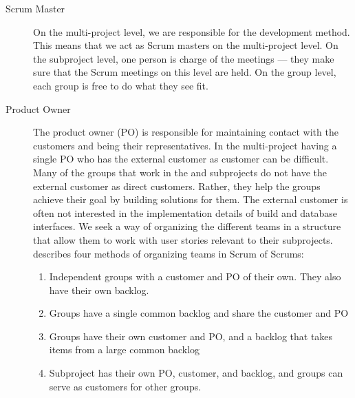 \begin{description}
  \item[Scrum Master] On the multi-project level, we are responsible for the development method. This means that we act as Scrum masters on the multi-project level. On the subproject level, one person is charge of the meetings --- they make sure that the Scrum meetings on this level are held. On the group level, each group is free to do what they see fit.
  \item[Product Owner] The product owner (PO) is responsible for maintaining contact with the customers and being their representatives. In the multi-project having a single PO who has the external customer  as customer can be difficult. Many of the groups that work in the \bd and \db subprojects do not have the external customer as direct customers. Rather, they help the \gui groups achieve their goal by building solutions for them. The external customer is often not interested in the implementation details of build and database interfaces. We seek a way of organizing the different teams in a structure that allow them to work with user stories relevant to their subprojects.  \textcite{bird_davies_2007} describes four methods of organizing teams in Scrum of Scrums:
  \begin{enumerate}
    \item Independent groups with a customer and PO of their own. They also have their own backlog.
    \item Groups have a single common backlog and share the customer and PO
    \item Groups have their own customer and PO, and a backlog that takes items from a large common backlog
    \item Subproject has their own PO, customer, and backlog, and groups can serve as customers for other groups.
  \end{enumerate}

\end{description}

